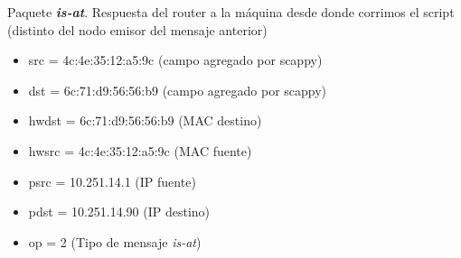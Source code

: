 \vspace{1cm}
Paquete \emph{\textbf{is-at}}. Respuesta del router a la máquina desde donde corrimos el script (distinto del nodo emisor del
mensaje anterior)

\begin{itemize}
\item src = 4c:4e:35:12:a5:9c (campo agregado por scappy)
\item dst = 6c:71:d9:56:56:b9 (campo agregado por scappy)
\item hwdst = 6c:71:d9:56:56:b9 (MAC destino)
\item hwsrc = 4c:4e:35:12:a5:9c (MAC fuente)
\item psrc = 10.251.14.1 (IP fuente)
\item pdst = 10.251.14.90 (IP destino)
\item op = 2 (Tipo de mensaje \emph{is-at})
\end{itemize}


